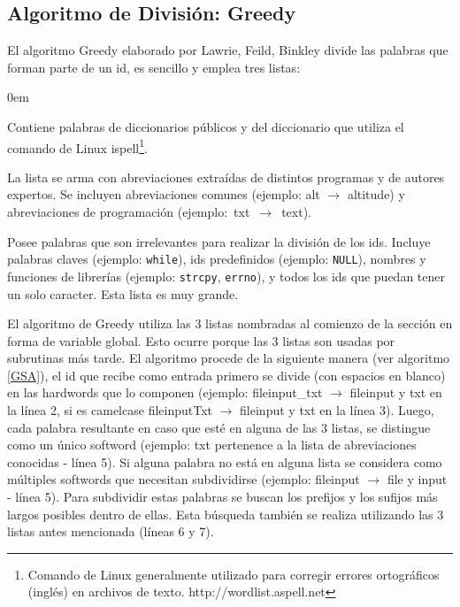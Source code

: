 \documentclass[a4paper,12pt]{report}
\begin{document}
\subsection{Algoritmo de División: Greedy}
\label{sec:algGre}

El algoritmo Greedy elaborado por Lawrie, Feild, Binkley \cite{DLFB06,FBL06,HDD06,LFBEX07,EHPV09} divide las palabras que forman parte de un id, es sencillo y emplea tres listas:
\begin{description}
\itemsep0em%
\item[Palabras de diccionarios:] Contiene palabras de diccionarios públicos y del diccionario que utiliza el comando de Linux \textsf{ispell}\footnote[1]{Comando de Linux generalmente utilizado para corregir errores ortográficos (inglés) en archivos de texto. http://wordlist.aspell.net}.

\item[Abreviaciones conocidas:] La lista se arma con abreviaciones extraídas de distintos programas y de autores expertos. Se incluyen abreviaciones comunes (ejemplo: \textsf{alt} $\rightarrow$ \textsf{altitude}) y abreviaciones de programación \mbox{(ejemplo: \textsf{txt} $\rightarrow$ \textsf{text}).}

\item[Palabras excluyentes (stop list):] Posee palabras que son irrelevantes para realizar la división de los ids. Incluye palabras claves (ejemplo: \texttt{while}), ids predefinidos (ejemplo: \texttt{NULL}), nombres y funciones de librerías (ejemplo: \texttt{strcpy}, \texttt{errno}), y todos los ids que puedan tener un solo caracter. Esta lista es muy grande.
\end{description}

El algoritmo de Greedy utiliza las 3 listas nombradas al comienzo de la sección en forma de variable global. Esto ocurre porque las 3 listas son usadas por subrutinas más tarde. El algoritmo procede de la siguiente manera (ver algoritmo \ref{GSA}), el id que recibe como entrada primero se divide (con espacios en blanco) en las hardwords que lo componen (ejemplo: \textsf{fileinput\_txt} $\rightarrow$ \mbox{\textsf{fileinput}} y \textsf{txt} en la línea 2, si es camelcase \textsf{fileinputTxt} $\rightarrow$ \textsf{fileinput} y \textsf{txt} en la línea 3). Luego, cada palabra resultante en caso que esté en alguna de las 3 listas, se distingue como un único softword (ejemplo: \textsf{txt} pertenence a la lista de abreviaciones conocidas - línea 5). Si alguna palabra no está en alguna lista se considera como múltiples softwords que necesitan subdividirse (ejemplo: \textsf{fileinput} $\rightarrow$ \textsf{file} y \textsf{input} - línea 5).
Para subdividir estas palabras se buscan los prefijos y los sufijos más largos posibles dentro de ellas. Esta búsqueda también se realiza utilizando las 3 listas antes mencionada (líneas 6 y 7).
\end{document}
